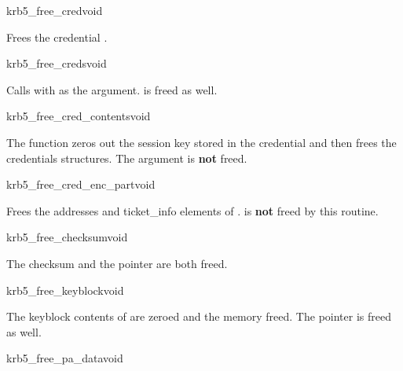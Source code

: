 \begin{funcdecl}{krb5_free_cred}{void}{\funcinout}
\end{funcdecl}

Frees the credential .

\begin{funcdecl}{krb5_free_creds}{void}{\funcinout}
\end{funcdecl}

Calls  with  as the
argument.  is freed as well.

\begin{funcdecl}{krb5_free_cred_contents}{void}{\funcinout}
\end{funcdecl}

The function zeros out the session key stored in the credential and then
frees the credentials structures. The argument  is
{\bf not} freed.


\begin{funcdecl}{krb5_free_cred_enc_part}{void}{\funcinout}
\end{funcdecl}

Frees the addresses and ticket_info elements of
.  is {\bf not} freed by this routine.

\begin{funcdecl}{krb5_free_checksum}{void}{\funcinout}
\end{funcdecl}

The checksum and the pointer  are both freed. 

\begin{funcdecl}{krb5_free_keyblock}{void}{\funcinout}
\end{funcdecl}

The keyblock contents of  are zeroed and the memory
freed. The pointer  is freed as well.

\begin{funcdecl}{krb5_free_pa_data}{void}{\funcinout}
\end{funcdecl}

